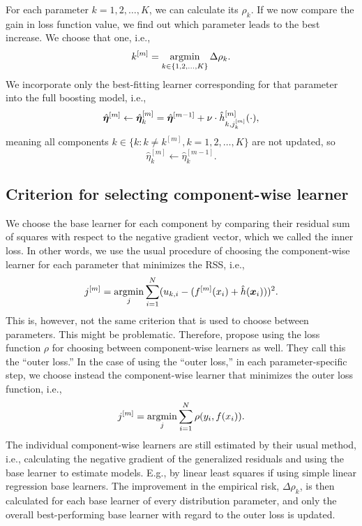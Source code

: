 For each parameter $k=1,2,\ldots,K$, we can calculate its $\rho_{k}$.
If we now compare the gain in loss function value, we find out which parameter leads to the best increase. We choose that one, i.e.,
\begin{equation}
    k^{[m]}=\operatorname*{argmin}_{k\in\{1,2,\ldots,K\}}\Delta\rho_{k}.
\end{equation}
We incorporate only the best-fitting learner corresponding for that parameter into the full boosting model, i.e.,
\begin{equation}
    \hat{\boldsymbol{\eta}}^{[m]}\gets \hat{\boldsymbol{\eta}}^{[m]}_{k}=\hat{\boldsymbol{\eta}}^{[m-1]}+\nu\cdot\hat{h}^{[m]}_{k,j_k^{[m]}}(\cdot),
\end{equation}
meaning all components $k\in\{k\colon k\neq k^{[m]}, k=1,2,\ldots,K\}$ are not updated, so
\begin{equation}
    \hat{\eta}_{k}^{[m]}\gets\hat{\eta}_{k}^{[m-1]}.
\end{equation}

\subsection{Criterion for selecting component-wise learner}
We choose the base learner for each component by comparing their residual sum of squares with respect to the negative gradient vector, which we called the inner loss.
In other words, we use the usual procedure of choosing the component-wise learner for each parameter that minimizes the RSS, i.e.,
\begin{equation}
    j^{[m]}=\operatorname*{argmin}_{j} \sum_{i=1}^N (u_{k,i}-(f^{[m]}(x_i)+\hat{h}(\bm{x}_i)))^2.
\end{equation}
This is, however, not the same criterion that is used to choose between parameters.
This might be problematic.
Therefore, \citet{thomas2018} propose using the loss function $\rho$ for choosing between component-wise learners as well.
They call this the ``outer loss.''
In the case of using the ``outer loss,'' in each parameter-specific step, we choose instead the component-wise learner that minimizes the outer loss function, i.e., 
\begin{equation}
    j^{[m]}=\operatorname*{argmin}_{j} \sum_{i=1}^N \rho(y_i,f(x_i)).
\end{equation}
The individual component-wise learners are still estimated by their usual method, i.e., calculating the negative gradient of the generalized residuals and using the base learner to estimate models.
E.g., by linear least squares if using simple linear regression base learners.
The improvement in the empirical risk, $\Delta\rho_{k}$, is then calculated for each base learner of every distribution parameter, and only the overall best-performing base learner with regard to the outer loss is updated.

